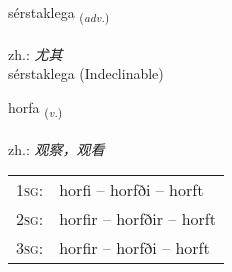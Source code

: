 \documentclass[frontgrid, backgrid]{flacards}\usepackage[]{graphicx}\usepackage[]{xcolor}
\begin{document}

\renewcommand{\flhead}{\vskip5pt \fboxsep=0pt {\small\bfseries\footnotesize Atviksorð | 副词}}
\renewcommand{\fcfoot}{\vskip5pt \fboxsep=0pt \hspace{2pt}{\small\bfseries\footnotesize 1K}}

\renewcommand{\blhead}{\vskip5pt {\small\bfseries\footnotesize Atviksorð | 副词 }}
\renewcommand{\bcfoot}{\vskip5pt \hspace{2pt}{\small\bfseries\footnotesize 1K}}


{sérstaklega \small{\textsubscript{(\textit{adv.})}} \\[1ex]
 \\
zh.: \emph{尤其} \\  [2ex]
sérstaklega (Indeclinable)}

\renewcommand{\flhead}{\vskip5pt \fboxsep=0pt {\small\bfseries\footnotesize Sagnorð | 动词}}
\renewcommand{\fcfoot}{\vskip5pt \fboxsep=0pt \hspace{2pt}{\small\bfseries\footnotesize 1K}}

\renewcommand{\blhead}{\vskip5pt {\small\bfseries\footnotesize Sagnorð | 动词 }}
\renewcommand{\bcfoot}{\vskip5pt \hspace{2pt}{\small\bfseries\footnotesize 1K}}


{horfa \small{\textsubscript{(\textit{v.})}} \\[1ex] %
\textphonetic{[hɔrva]} \\
zh.: \emph{观察，观看} \\  [2ex]
\renewcommand*{\arraystretch}{0.8}
\begin{tabular}{p{1cm}l}
\textsc{1sg}: & horfi -- horfði -- horft \\ 
\textsc{2sg}: & horfir -- horfðir -- horft \\ 
\textsc{3sg}: & horfir -- horfði -- horft \\ 
\end{tabular}
}
\end{document}

